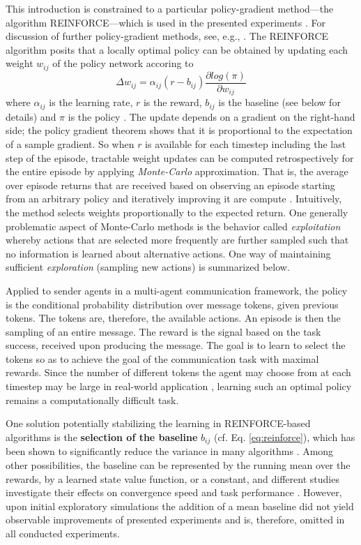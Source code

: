 This introduction is constrained to a particular policy-gradient method---the algorithm REINFORCE---which is used in the presented experiments \parencite{williams1992simple}. For discussion of further policy-gradient methods, see, e.g., \cite{sutton2018reinforcement}. 
The REINFORCE algorithm posits that a locally optimal policy can be obtained by updating each weight $w_{ij}$ of the policy network accoring to 
\begin{equation}
\label{eq:reinforce}
\Delta w_{ij} = \alpha_{ij} (r - b_{ij}) \frac{\partial log(\pi)}{\partial w_{ij}}
\end{equation}
where $\alpha_{ij}$ is the learning rate, $r$ is the reward, $b_{ij}$ is the baseline (see below for details) and $\pi$ is the policy \parencite[cf.][p. 234]{williams1992simple}. The update depends on a gradient on the right-hand side; the policy gradient theorem shows that it is proportional to the expectation of a sample gradient. So when $r$ is available for each timestep including the last step of the episode, tractable weight updates can be computed retrospectively for the entire episode by applying \textit{Monte-Carlo} approximation. That is, the average over episode returns that are received based on observing an episode starting from an arbitrary policy and iteratively improving it are compute \parencite{sutton2018reinforcement}. Intuitively, the method selects weights proportionally to the expected return. One generally problematic aspect of Monte-Carlo methods is the behavior called \textit{exploitation} whereby actions that are selected more frequently are further sampled such that no information is learned about alternative actions. One way of maintaining sufficient \textit{exploration} (sampling new actions) is summarized below. 

Applied to sender agents in a multi-agent communication framework, the policy is the conditional probability distribution over message tokens, given previous tokens. The tokens are, therefore, the available actions. An episode is then the sampling of an entire message. The reward is the signal based on the task success, received upon producing the message. The goal is to learn to select the tokens so as to achieve the goal of the communication task with maximal rewards. Since the number of different tokens the agent may choose from at each timestep may be large in real-world application \parencite[cf.][]{he2015deep}, learning such an optimal policy remains a computationally difficult task.

One solution potentially stabilizing the learning in REINFORCE-based algorithms is the \textbf{selection of the baseline} $b_{ij}$ (cf. Eq. \ref{eq:reinforce}), which has been shown to significantly reduce the variance in many algorithms \parencite{sutton2018reinforcement}. 
Among other possibilities, the baseline can be represented by the running mean over the rewards, by a learned state value function, or a constant, and different studies investigate their effects on convergence speed and task performance \parencite{williams1992simple, greensmith2004variance}. However, upon initial exploratory simulations the addition of a mean baseline did not yield observable improvements of presented experiments and is, therefore, omitted in all conducted experiments. 

